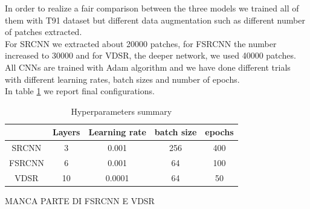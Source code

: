 \documentclass[10pt,twocolumn,letterpaper]{article}
\begin{document}
In order to realize a fair comparison between the three models we trained all of them with T91 dataset but different data augmentation such as different number of patches extracted.\\
For SRCNN we extracted about 20000 patches, for FSRCNN the number increased to 30000 and for VDSR, the deeper network, we used 40000 patches.\\
All CNNs are trained with  Adam algorithm \cite{kingma2014adam} and we have done different trials with different learning rates, batch sizes and number of epochs.\\
In table \ref{param} we report final configurations.
\begin{table}[h!]
\begin{center}
	\begin{tabular}{|c| c| c| c| c|} 
		
		\hline
		& Layers & Learning rate & batch size & epochs \\ 
		\hline
		SRCNN & 3 & 0.001 & 256 & 400 \\
		\hline
		FSRCNN & 6 & 0.001 & 64 & 100\\
		\hline
		VDSR & 10 & 0.0001 & 64 & 50\\
		\hline
	\end{tabular}
\label{param}
\end{center}
\caption{Hyperparameters summary}
\end{table}

MANCA PARTE DI FSRCNN E VDSR
\end{document}
